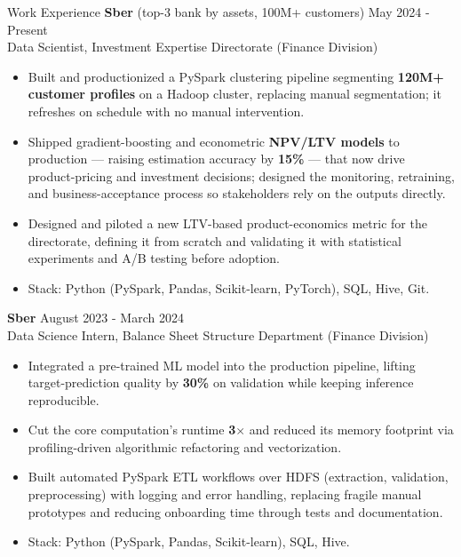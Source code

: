 \documentclass{resume}
\begin{document}
	\begin{rSection}{Work Experience}
		\textbf{Sber} (top-3 bank by assets, 100M+ customers) \hfill {May 2024 - Present}\\
		Data Scientist, Investment Expertise Directorate (Finance Division) \\
		\vspace{-1.25em}
		\begin{itemize}
			\itemsep -3pt {}
			\item Built and productionized a PySpark clustering pipeline segmenting \textbf{120M+ customer
			profiles} on a Hadoop cluster, replacing manual segmentation; it refreshes on schedule with no
			manual intervention.
			\item Shipped gradient-boosting and econometric \textbf{NPV/LTV models} to production --- raising
			estimation accuracy by \textbf{15\%} --- that now drive product-pricing and investment decisions;
			designed the monitoring, retraining, and business-acceptance process so stakeholders rely on the
			outputs directly.
			\item Designed and piloted a new LTV-based product-economics metric for the directorate, defining
			it from scratch and validating it with statistical experiments and A/B testing before adoption.
			\item Stack: Python (PySpark, Pandas, Scikit-learn, PyTorch), SQL, Hive, Git.
		\end{itemize}

		\textbf{Sber} \hfill {August 2023 - March 2024}\\
		Data Science Intern, Balance Sheet Structure Department (Finance Division) \\
		\vspace{-1.25em}
		\begin{itemize}
			\itemsep -3pt {}
			\item Integrated a pre-trained ML model into the production pipeline, lifting target-prediction
			quality by \textbf{30\%} on validation while keeping inference reproducible.
			\item Cut the core computation's runtime \textbf{3$\times$} and reduced its memory footprint via
			profiling-driven algorithmic refactoring and vectorization.
			\item Built automated PySpark ETL workflows over HDFS (extraction, validation, preprocessing) with
			logging and error handling, replacing fragile manual prototypes and reducing onboarding time
			through tests and documentation.
			\item Stack: Python (PySpark, Pandas, Scikit-learn), SQL, Hive.
		\end{itemize}
	\end{rSection}
\end{document}
